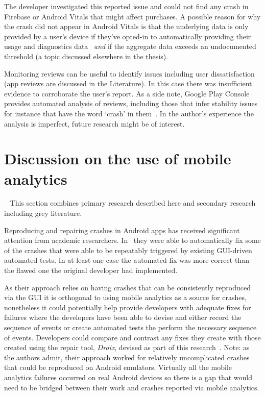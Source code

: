The developer investigated this reported issue and could not find any crash in Firebase or Android Vitals that might affect purchases. A possible reason for why the crash did not appear in Android Vitals is that the underlying data is only provided by a user's device if they've opted-in to automatically providing their usage and diagnostics data~\citep{google_play_view_crashes_and_anr_errors} \textit{and} if the aggregate data exceeds an undocumented threshold (a topic discussed elsewhere in the thesis). 

Monitoring reviews can be useful to identify issues including user dissatisfaction (app reviews are discussed in the Literature). In this case there was insufficient evidence to corroborate the user's report. As a side note, Google Play Console provides automated analysis of reviews, including those that infer stability issues for instance that have the word `crash' in them~\citep{googlesupport_reviews_analysis}. In the author's experience the analysis is imperfect, future research might be of interest.


\section{Discussion on the use of mobile analytics}~\label{aiu-discussion-section}
This section combines primary research described here and secondary research including grey literature.

 Reproducing and repairing crashes in Android apps has received significant attention from academic researchers. In~\citet{tan2018_repairing_crashes_in_android_apps} they were able to automatically fix some of the crashes that were able to be repeatably triggered by existing GUI-driven automated tests. In at least one case the automated fix was more correct than the flawed one the original developer had implemented. 

As their approach relies on having crashes that can be consistently reproduced via the GUI it is orthogonal to using mobile analytics as a source for crashes, nonetheless it could potentially help provide developers with adequate fixes for failures where the developers have been able to devise and either record the sequence of events or create automated tests the perform the necessary sequence of events. Developers could compare and contrast any fixes they create with those created using the repair tool, \textit{Droix}, devised as part of this research~\citep{tan2018_repairing_crashes_in_android_apps}. Note: as the authors admit, their approach worked for relatively uncomplicated crashes that could be reproduced on Android emulators. Virtually all the mobile analytics failures occurred on real Android devices so there is a gap that would need to be bridged between their work and crashes reported via mobile analytics.  


